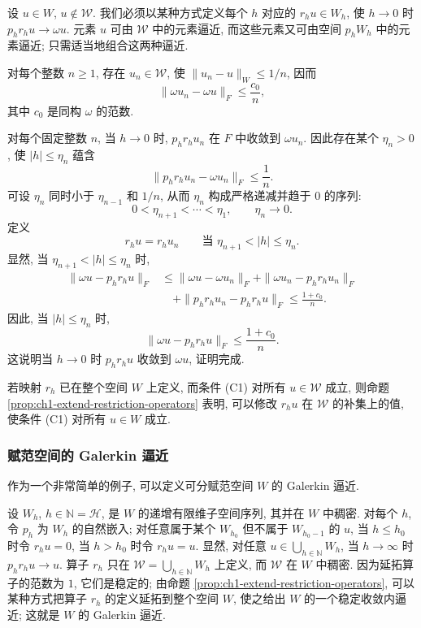 \begin{Proof}
设 $u\in W$, $u\notin\mathcal W$. 我们必须以某种方式定义每个 $h$ 对应的 $r_hu\in W_h$, 使 $h\to0$ 时 $p_hr_hu\to\omega u$. 元素 $u$ 可由 $\mathcal W$ 中的元素逼近, 而这些元素又可由空间 $p_hW_h$ 中的元素逼近; 只需适当地组合这两种逼近.

对每个整数 $n\geq1$, 存在 $u_n\in\mathcal W$, 使 $\|u_n-u\|_W\leq1/n$, 因而
\begin{equation}
\|\omega u_n-\omega u\|_F\leq\frac{c_0}{n},
\label{eq:ch1-approximation-omega-bound}
\end{equation}
其中 $c_0$ 是同构 $\omega$ 的范数.

对每个固定整数 $n$, 当 $h\to0$ 时, $p_hr_hu_n$ 在 $F$ 中收敛到 $\omega u_n$. 因此存在某个 $\eta_n>0$, 使 $\lvert h\rvert\leq\eta_n$ 蕴含
\[
\|p_hr_hu_n-\omega u_n\|_F\leq\frac1n.
\]
可设 $\eta_n$ 同时小于 $\eta_{n-1}$ 和 $1/n$, 从而 $\eta_n$ 构成严格递减并趋于 $0$ 的序列:
\[
0<\eta_{n+1}<\cdots<\eta_1,\qquad \eta_n\to0.
\]
定义
\[
r_hu=r_hu_n\qquad\text{当 }\eta_{n+1}<\lvert h\rvert\leq\eta_n.
\]
显然, 当 $\eta_{n+1}<\lvert h\rvert\leq\eta_n$ 时,
\[
\begin{aligned}
\|\omega u-p_hr_hu\|_F
&\leq\|\omega u-\omega u_n\|_F+\|\omega u_n-p_hr_hu_n\|_F\\
&\quad+\|p_hr_hu_n-p_hr_hu\|_F
\leq\frac{1+c_0}{n}.
\end{aligned}
\]
因此, 当 $\lvert h\rvert\leq\eta_n$ 时,
\[
\|\omega u-p_hr_hu\|_F\leq\frac{1+c_0}{n}.
\]
这说明当 $h\to0$ 时 $p_hr_hu$ 收敛到 $\omega u$, 证明完成.
\end{Proof}

\begin{Remark}
\label{rem:ch1-modify-restriction-operators}
若映射 $r_h$ 已在整个空间 $W$ 上定义, 而条件 (C1) 对所有 $u\in\mathcal W$ 成立, 则命题 \ref{prop:ch1-extend-restriction-operators} 表明, 可以修改 $r_hu$ 在 $\mathcal W$ 的补集上的值, 使条件 (C1) 对所有 $u\in W$ 成立.
\end{Remark}

\subsubsection*{赋范空间的 Galerkin 逼近}

作为一个非常简单的例子, 可以定义可分赋范空间 $W$ 的 Galerkin 逼近.

设 $W_h$, $h\in\mathbb N=\mathcal H$, 是 $W$ 的递增有限维子空间序列, 其并在 $W$ 中稠密. 对每个 $h$, 令 $p_h$ 为 $W_h$ 的自然嵌入; 对任意属于某个 $W_{h_0}$ 但不属于 $W_{h_0-1}$ 的 $u$, 当 $h\leq h_0$ 时令 $r_hu=0$, 当 $h>h_0$ 时令 $r_hu=u$. 显然, 对任意 $u\in\bigcup_{h\in\mathbb N}W_h$, 当 $h\to\infty$ 时 $p_hr_hu\to u$. 算子 $r_h$ 只在 $\mathcal W=\bigcup_{h\in\mathbb N}W_h$ 上定义, 而 $\mathcal W$ 在 $W$ 中稠密. 因为延拓算子的范数为 $1$, 它们是稳定的; 由命题 \ref{prop:ch1-extend-restriction-operators}, 可以某种方式把算子 $r_h$ 的定义延拓到整个空间 $W$, 使之给出 $W$ 的一个稳定收敛内逼近; 这就是 $W$ 的 Galerkin 逼近.

